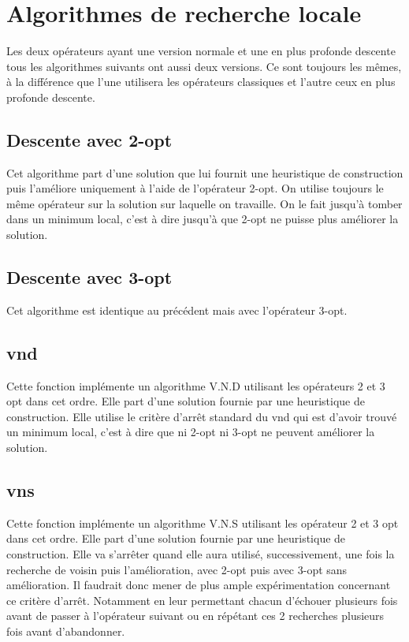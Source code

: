 \documentclass[12pt,a4paper]{article}
\begin{document}
\section{Algorithmes de recherche locale}

Les deux opérateurs ayant une version normale et une en plus profonde descente tous les algorithmes suivants ont aussi deux versions. Ce sont toujours les mêmes, à la différence que l'une utilisera les opérateurs classiques et l'autre ceux en plus profonde descente.

\subsection{Descente avec 2-opt}

Cet algorithme part d'une solution que lui fournit une heuristique de construction puis l’améliore uniquement à l'aide de l'opérateur 2-opt. On utilise toujours le même opérateur sur la solution sur laquelle on travaille. On le fait jusqu’à tomber dans un minimum local, c'est à dire jusqu’à que 2-opt ne puisse plus améliorer la solution.

\subsection{Descente avec 3-opt}

Cet algorithme est identique au précédent mais avec l'opérateur 3-opt.

\subsection{vnd}

Cette fonction implémente un algorithme V.N.D utilisant les opérateurs 2 et 3 opt dans cet ordre. Elle part d'une solution fournie par une heuristique de construction. Elle utilise le critère d’arrêt standard du vnd qui est d'avoir trouvé un minimum local, c'est à dire que ni 2-opt ni 3-opt ne peuvent améliorer la solution.

\subsection{vns}

Cette fonction implémente un algorithme V.N.S utilisant les opérateur 2 et 3 opt dans cet ordre. Elle part d'une solution fournie par une heuristique de construction. Elle va s’arrêter quand elle aura utilisé, successivement, une fois la recherche de voisin puis l'amélioration, avec 2-opt puis avec 3-opt sans amélioration. Il faudrait donc mener de plus ample expérimentation concernant ce critère d’arrêt. Notamment en leur permettant chacun d'échouer plusieurs fois avant de passer à l'opérateur suivant ou en répétant ces 2 recherches plusieurs fois avant d'abandonner.
\end{document}
